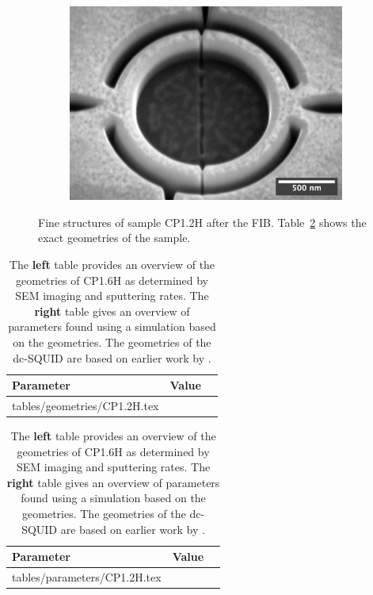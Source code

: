 \begin{figure}[ht!]
\begin{subfigure}[t]{0.3\textwidth}
	\end{subfigure}
	\hfill
	\begin{subfigure}[t]{0.3\textwidth}
		\centering
		\includegraphics[width=\textwidth]{figures/samples/CP1/CP1.2H_SEM_SQUID.jpg}
	\end{subfigure}

	\caption{Fine structures of sample CP1.2H after the FIB. Table~\ref{tab:CP1.6H-geometries} shows the exact geometries of the sample.}
	\label{fig:CP1.2H-SEM-images}
\end{figure}

\begin{table}
	\begin{subtable}{.6\linewidth}
		\begin{tabular}[t]{@{}lrr@{}}
			\toprule
			Parameter & Value \\ \midrule
			\expandableinput tables/geometries/CP1.2H.tex
			\bottomrule
		\end{tabular}
    \end{subtable}
    \hfill
    \begin{subtable}{.3\linewidth}
    	\flushright
    	\begin{tabular}[t]{@{}lrr@{}}
    		\toprule
    		Parameter & Value \\ \midrule
    		\expandableinput tables/parameters/CP1.2H.tex
    		\bottomrule
    	\end{tabular}
    \end{subtable}
    \caption{The \textbf{left} table provides an overview of the geometries of CP1.6H as determined by SEM imaging and sputtering rates. The \textbf{right} table gives an overview of parameters found using a simulation based on the geometries. The geometries of the dc-SQUID are based on earlier work by \citeauthor{rogSQUIDontipMagneticMicroscopy2022} \citeyear{rogSQUIDontipMagneticMicroscopy2022}.}
    \label{tab:CP1.6H-geometries}
\end{table}